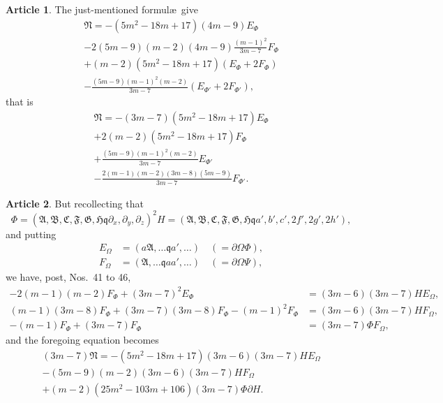 \documentclass[11pt,a4paper]{article}
\theoremstyle{definition}
\newtheorem{art}{Article}[section]
\newcommand{\fA}{\mathfrak{A}}
\newcommand{\fB}{\mathfrak{B}}
\newcommand{\fC}{\mathfrak{C}}
\newcommand{\fF}{\mathfrak{F}}
\newcommand{\fG}{\mathfrak{G}}
\newcommand{\fH}{\mathfrak{H}}
\newcommand{\fN}{\mathfrak{N}}
\begin{document}
\begin{art}
The just-mentioned formul\ae\ give
\begin{multline*}
\fN = -(5m^2 - 18m + 17)(4m-9)E_\Phi \\
- 2(5m - 9)(m - 2)(4m - 9)\frac{(m-1)^2}{3m-7} F_\Phi \\
+ (m-2)(5m^2 - 18m + 17)(E_\Phi + 2F_\Phi) \\
- \frac{(5m-9)(m-1)^2(m-2)}{3m-7}(E_{\Phi'} + 2F_{\Phi'}),
\end{multline*}
that is
\begin{multline*}
\fN = -(3m-7)(5m^2 - 18m + 17)E_\Phi \\
+ 2(m-2)(5m^2 - 18m + 17)F_\Phi \\
+ \frac{(5m-9)(m-1)^2(m-2)}{3m-7} E_{\Phi'} \\
- \frac{2(m-1)(m-2)(3m-8)(5m-9)}{3m-7} F_{\Phi'}.
\end{multline*}
\end{art}

\begin{art}
But recollecting that
\[
\Phi = (\fA, \fB, \fC, \fF, \fG, \fH \mathbin{\mathfrak{q}} \partial_x, \partial_y, \partial_z)^2 H
= (\fA, \fB, \fC, \fF, \fG, \fH \mathbin{\mathfrak{q}} a', b', c', 2f', 2g', 2h'),
\]
and putting
\begin{align*}
E_\Omega &= (a\fA, \dots \mathbin{\mathfrak{q}} a', \dots) \quad (= \partial \Omega \Phi), \\
F_\Omega &= (\fA, \dots \mathbin{\mathfrak{q}} a a', \dots) \quad (= \partial \Omega \Psi),
\end{align*}
we have, post, Nos.\ 41 to 46,
\begin{align*}
-2(m-1)(m-2)F_\Phi + (3m-7)^2 E_\Phi &= (3m-6)(3m-7)H E_\Omega, \\
(m-1)(3m-8)F_\Phi + (3m-7)(3m-8)F_\Phi - (m-1)^2 F_\Phi
&= (3m-6)(3m-7)H F_\Omega, \\
-(m-1)F_\Phi + (3m-7)F_\Phi &= (3m-7)\Phi F_\Omega,
\end{align*}
and the foregoing equation becomes
\begin{multline*}
(3m-7)\fN = -(5m^2 - 18m + 17)(3m-6)(3m-7)H E_\Omega \\
- (5m-9)(m-2)(3m-6)(3m-7)H F_\Omega \\
+ (m-2)(25m^2 - 103m + 106)(3m-7)\Phi \partial H.
\end{multline*}
\end{art}
\end{document}
